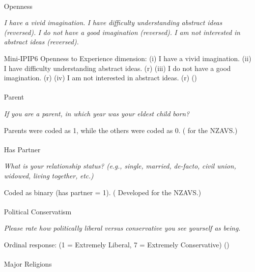 \documentclass[
  single column]{article}
\makeatletter
\let\oldparagraph\paragraph
\renewcommand{\paragraph}{
    \@ifstar
      \xxxParagraphStar
      \xxxParagraphNoStar
  }
\newcommand{\xxxParagraphStar}[1]{\oldparagraph*{#1}\mbox{}}
\newcommand{\xxxParagraphNoStar}[1]{\oldparagraph{#1}\mbox{}}
\makeatother
\begin{document}
\paragraph{Openness}\label{openness}

\emph{I have a vivid imagination.} \emph{I have difficulty understanding
abstract ideas (reversed).} \emph{I do not have a good imagination
(reversed).} \emph{I am not interested in abstract ideas (reversed).}

Mini-IPIP6 Openness to Experience dimension: (i) I have a vivid
imagination. (ii) I have difficulty understanding abstract ideas. (r)
(iii) I do not have a good imagination. (r) (iv) I am not interested in
abstract ideas. (r) ()

\paragraph{Parent}\label{parent}

\emph{If you are a parent, in which year was your eldest child born?}

Parents were coded as 1, while the others were coded as 0.
( for the NZAVS.)

\paragraph{Has Partner}\label{has-partner}

\emph{What is your relationship status? (e.g., single, married,
de-facto, civil union, widowed, living together, etc.)}

Coded as binary (has partner = 1).
( Developed for the
NZAVS.)

\paragraph{Political Conservatism}\label{political-conservatism}

\emph{Please rate how politically liberal versus conservative you see
yourself as being.}

Ordinal response: (1 = Extremely Liberal, 7 = Extremely Conservative)
()

\paragraph{Major Religions}\label{major-religions}
\end{document}
